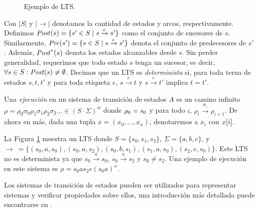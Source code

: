 \begin{figure}
\begin{center}
  \caption{Ejemplo de LTS.}
    \label{figure:lts1}
  \end{center}
  \end{figure}
Con $|S|$ y $|{\rightarrow}|$ denotamos la cantidad de estados y arcos, respectivamente. Definimos $\post(s) = \{s' \in S \mid s \xrightarrow{e} s' \}$ como el conjunto de sucesores de $s$. Similarmente,  $\pre(s') = \{s \in S \mid s \xrightarrow{e} s' \}$ denota el conjunto de predecesores de $s'$.
Además, $\post^{*}(s)$ denota los estados alcanzables desde $s$.
Sin perder generalidad, requerimos que todo estado $s$ tenga un sucesor, es decir, $\forall s \in S : \post(s) \neq \emptyset$. Decimos que un LTS es \emph{determinista} si, para toda terna de estados  $s,t, t'$ y para toda etiqueta $e$, $s \xrightarrow{e} t$ y $s \xrightarrow{e} t'$ implica $t=t'$. 

Una \emph{ejecución} en un sistema de transición de estados $A$ es un camino infinito $\rho = \rho_0 \sigma_0 \rho_1 \sigma_1  \rho_2 \sigma_2 \dots \in (S \cdot \Sigma)^{w}$ 
donde $\rho_0 = \InitState$ y para todo $i$, $\rho_i \xrightarrow{\sigma_i} \rho_{i+1}$. De ahora en más, dada una tupla $ x = (x_0,\dots,x_n)$, denotaremos a $x_i$ con  $\pr{i}{x}$.

La Figura \ref{figure:lts1} muestra un LTS donde $S = \{ s_0, s_1, s_2\}$, $\Sigma = \{a, b, c\}$, y $\rightarrow\ = \{ (s_0,a,s_0), (s_0,a,s_2), (s_0,b,s_1), (s_1,a,s_0), (s_2,c,s_0) \}$. Este LTS no es determinista ya que $s_0 \xrightarrow{a} s_0$, $s_0 \xrightarrow{a} s_2$ y $s_0 \neq s_2$. Una ejemplo de ejecución en este sistema es $\rho = s_0 a s_2 c  (s_0 a)^{\omega}$.

Los sistemas de transición de estados pueden ser utilizados para representar sistemas y verificar propiedades sobre ellos, una introducción más detallada puede encontrarse en \cite{BaierK08}.

